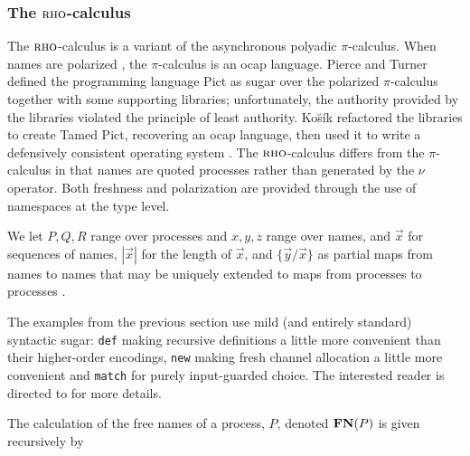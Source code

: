\documentclass[submission,copyright,creativecommons]{eptcs}
\newcommand{\id}[1]{\texttt{#1}}
\newcommand{\pzero}{\mathbin{0}}
\newcommand{\juxtap}{\mathbin{\id{|}}}
\newcommand{\freenames}[1]{\mathbin{\bold{FN}(#1)}}
\newcommand{\binpar}[2]{#1 \juxtap #2}
\newcommand{\defneqls}{\coloneqq}
\newcommand{\bc}{\mathbin{\mathbf{::=}}}
\numberwithin{equation}{subsection}
\newcommand{\pic}{$\pi$-calculus}
\newcommand{\rhoc}{${\textsc{rho}}$-calculus}
\begin{document}
\subsubsection{The \rhoc}

The {\rhoc} \cite{DBLP:journals/entcs/MeredithR05}
is a variant of the asynchronous polyadic {\pic}.  When names are
polarized \cite{conf/fsttcs/Odersky95}, the {\pic} is an ocap
language.  Pierce and Turner \cite{PierceTurner:PictDesign}
defined the programming language Pict as sugar over the polarized {\pic}
together with some supporting libraries; unfortunately, the authority
provided by the libraries violated the principle of least authority.
Ko\u{s}\'{i}k refactored the libraries to create Tamed Pict, recovering
an ocap language, then used it to write a defensively consistent
operating system \cite{kosik:dep}. The {\rhoc} differs from the 
{\pic} in that names are quoted processes
rather than generated by the $\nu$ operator.  Both freshness and 
polarization are provided through the use of namespaces at the type level.

We let ${P, Q, R}$ range over processes and ${x, y, z}$ range over
names, and $\vec{x}$ for sequences of names, $|\vec{x}|$ for the
length of $\vec{x}$, and $\{ \vec{y} / \vec{x} \}$ as partial maps from
names to names that may be uniquely extended to maps from processes to
processes \cite{DBLP:journals/entcs/MeredithR05}.


The examples from the previous section use mild (and entirely
standard) syntactic sugar: \texttt{def} making recursive definitions a
little more convenient than their higher-order encodings, \texttt{new}
making fresh channel allocation a little more convenient and
\texttt{match} for purely input-guarded choice. The interested
reader is directed to \cite{DBLP:Journals/Corr/MeredithSD13} for more details.

The calculation of the free names of a process, $P$, denoted
$\freenames{P}$ is given recursively by

\end{document}
